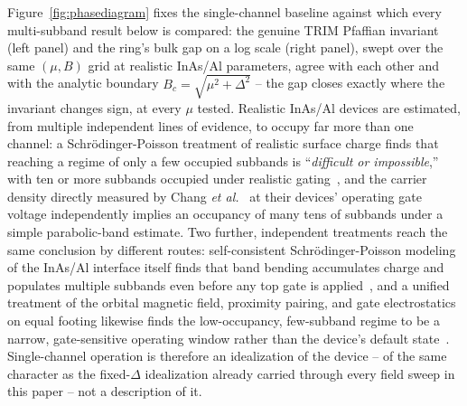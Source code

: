 \documentclass[aps,physrev,reprint,superscriptaddress,amsmath,amssymb,floatfix]{revtex4-2}
\begin{document}
Figure~\ref{fig:phasediagram} fixes the single-channel baseline against
which every multi-subband result below is compared: the genuine TRIM
Pfaffian invariant (left panel) and the ring's bulk gap on a log scale
(right panel), swept over the same $(\mu,B)$ grid at realistic InAs/Al
parameters, agree with each other and with the analytic boundary
$B_c=\sqrt{\mu^2+\Delta^2}$ -- the gap closes exactly where the invariant
changes sign, at every $\mu$ tested. Realistic InAs/Al devices are
estimated, from multiple independent lines of evidence, to occupy far
more than one channel: a Schr\"odinger-Poisson treatment of realistic
surface charge finds that reaching a regime of only a few occupied
subbands is ``\emph{difficult or impossible},'' with ten or more subbands
occupied under realistic gating~\cite{woods2020}, and the carrier density
directly measured by Chang \emph{et al.}~\cite{chang2015} at their
devices' operating gate voltage independently implies an occupancy of
many tens of subbands under a simple parabolic-band estimate. Two further,
independent treatments reach the same conclusion by different routes:
self-consistent Schr\"odinger-Poisson modeling of the InAs/Al interface
itself finds that band bending accumulates charge and populates multiple
subbands even before any top gate is applied~\cite{mikkelsen2018hybridization},
and a unified treatment of the orbital magnetic field, proximity pairing,
and gate electrostatics on equal footing likewise finds the low-occupancy,
few-subband regime to be a narrow, gate-sensitive operating window rather
than the device's default state~\cite{winkler2019unified}. Single-channel
operation is therefore an idealization of the device -- of the same
character as the fixed-$\Delta$ idealization already carried through
every field sweep in this paper -- not a description of it.
\end{document}
